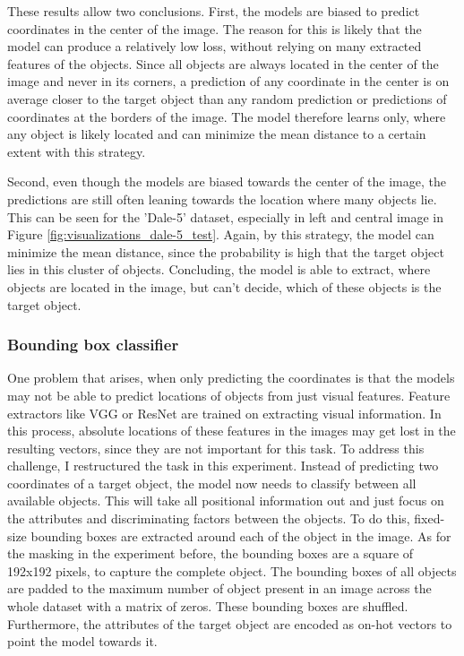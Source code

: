 These results allow two conclusions.
First, the models are biased to predict coordinates in the center of the image.
The reason for this is likely that the model can produce a relatively low loss, without relying on many extracted features of the objects.
Since all objects are always located in the center of the image and never in its corners, a prediction of any coordinate in the center is on average closer to the target object than any random prediction or predictions of coordinates at the borders of the image.
The model therefore learns only, where any object is likely located and can minimize the mean distance to a certain extent with this strategy.

Second, even though the models are biased towards the center of the image, the predictions are still often leaning towards the location where many objects lie.
This can be seen for the 'Dale-5' dataset, especially in left and central image in Figure \ref{fig:visualizations_dale-5_test}.
Again, by this strategy, the model can minimize the mean distance, since the probability is high that the target object lies in this cluster of objects.
Concluding, the model is able to extract, where objects are located in the image, but can't decide, which of these objects is the target object.

\subsubsection{Bounding box classifier}

One problem that arises, when only predicting the coordinates is that the models may not be able to predict locations of objects from just visual features.
Feature extractors like VGG or ResNet are trained on extracting visual information.
In this process, absolute locations of these features in the images may get lost in the resulting vectors, since they are not important for this task.
To address this challenge, I restructured the task in this experiment.
Instead of predicting two coordinates of a target object, the model now needs to classify between all available objects.
This will take all positional information out and just focus on the attributes and discriminating factors between the objects.
To do this, fixed-size bounding boxes are extracted around each of the object in the image.
As for the masking in the experiment before, the bounding boxes are a square of 192x192 pixels, to capture the complete object. 
The bounding boxes of all objects are padded to the maximum number of object present in an image across the whole dataset with a matrix of zeros.
These bounding boxes are shuffled.
Furthermore, the attributes of the target object are encoded as on-hot vectors to point the model towards it.

